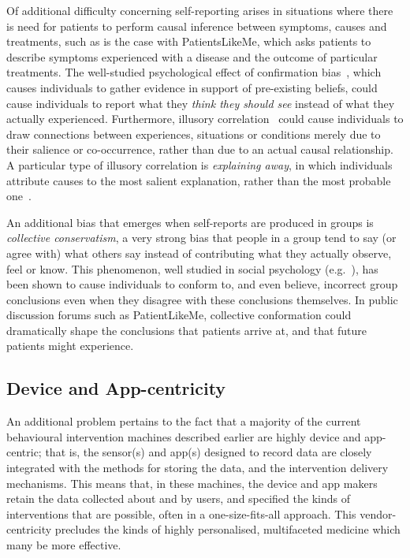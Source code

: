 \documentclass{www13-companion-accepted}
\begin{document}
Of additional difficulty concerning self-reporting arises in situations
where there is need for patients to perform causal inference between
symptoms, causes and treatments, such as is the case with PatientsLikeMe,
which asks patients to describe symptoms experienced with a disease
and the outcome of particular treatments.  The well-studied
psychological effect of confirmation bias~\cite{confirmationbias},
which causes individuals to gather evidence in support of pre-existing
beliefs, could cause individuals to report what they \emph{think they
  should see} instead of what they actually experienced.  Furthermore,
illusory correlation~\cite{chapman1969illusory} could cause
individuals to draw connections between experiences, situations or
conditions merely due to their salience or co-occurrence, rather than
due to an actual causal relationship. A particular type of illusory
correlation is \emph{explaining away}, in which individuals attribute
causes to the most salient explanation, rather than the most probable
one~\cite{gilovich1983biased}.

An additional bias that emerges when self-reports are produced in
groups is \emph{collective conservatism}, a very strong bias that
people in a group tend to say (or agree with) what others say instead
of contributing what they actually observe, feel or know.  This
phenomenon, well studied in social psychology
(e.g.~\cite{aronson2003readings}), has been shown to cause individuals
to conform to, and even believe, incorrect group conclusions even when
they disagree with these conclusions themselves.  In public discussion
forums such as PatientLikeMe, collective conformation could dramatically
shape the conclusions that patients arrive at, and that future patients
might experience.

\subsection{Device and App-centricity}

An additional problem pertains to the fact that a majority of the
current behavioural intervention machines described earlier are highly
device and app-centric; that is, the sensor(s) and app(s) designed to
record data are closely integrated with the methods for storing the
data, and the intervention delivery mechanisms.  This means that, in
these machines, the device and app makers retain the data collected
about and by users, and specified the kinds of interventions that are
possible, often in a one-size-fits-all approach.  This
vendor-centricity precludes the kinds of highly personalised,
multifaceted medicine which many be more effective.
\end{document}
